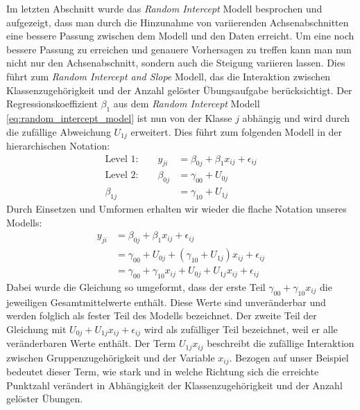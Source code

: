 \documentclass[12pt]{article}\usepackage[]{graphicx}\usepackage[]{color}
\numberwithin{equation}{section}
\begin{document}
Im letzten Abschnitt wurde das \textit{Random Intercept} Modell besprochen und aufgezeigt, dass man durch die Hinzunahme von variierenden Achsenabschnitten eine bessere Passung zwischen dem Modell und den Daten erreicht. Um eine noch bessere Passung zu erreichen und genauere Vorhersagen zu treffen kann man nun nicht nur den Achsenabschnitt, sondern auch die Steigung variieren lassen. Dies führt zum \textit{Random Intercept and Slope} Modell, das die Interaktion zwischen Klassenzugehörigkeit und der Anzahl gelöster Übungsaufgabe berücksichtigt. Der Regressionskoeffizient $\beta_{1}$ aus dem \textit{Random Intercept} Modell \eqref{eq:random_intercept_model} ist nun von der Klasse $j$ abhängig und wird durch die zufällige Abweichung $U_{1j}$ erweitert. Dies führt zum folgenden Modell in der hierarchischen Notation:
\begin{equation} \label{eq:random_intercept_slope_model}
\begin{split}	
 \text{Level 1:}  \qquad y_{ji} & = \beta_{0j} + \beta_{1}x_{ij} + \epsilon_{ij}\\
 \text{Level 2:} \qquad \beta_{0j} & = \gamma_{00} + U_{0j}\\
 \beta_{1j} & = \gamma_{10} + U_{1j}
\end{split}	
\end{equation} 
Durch Einsetzen und Umformen erhalten wir wieder die flache Notation unseres Modells:
\begin{equation} \label{eq:flat_random_intercept_slope_model}
\begin{split}	
y_{ji} & = \beta_{0j} + \beta_{1}x_{ij} + \epsilon_{ij}\\
& = \gamma_{00} + U_{0j} + (\gamma_{10} + U_{1j})x_{ij} + \epsilon_{ij}\\
& = \gamma_{00} + \gamma_{10}x_{ij} + U_{0j} + U_{1j}x_{ij} + \epsilon_{ij}
\end{split}	
\end{equation} 
Dabei wurde die Gleichung so umgeformt, dass der erste Teil $\gamma_{00} + \gamma_{10}x_{ij}$ die jeweiligen Gesamtmittelwerte enthält. Diese Werte sind unveränderbar und werden folglich als fester Teil des Modells bezeichnet. Der zweite Teil der Gleichung mit $U_{0j} + U_{1j}x_{ij} + \epsilon_{ij}$ wird als zufälliger Teil bezeichnet, weil er alle veränderbaren Werte enthält. Der Term $U_{1j}x_{ij}$ beschreibt die zufällige Interaktion zwischen Gruppenzugehörigkeit und der Variable $x_{ij}$. Bezogen auf unser Beispiel bedeutet dieser Term, wie stark und in welche Richtung sich die erreichte Punktzahl verändert in Abhängigkeit der Klassenzugehörigkeit und der Anzahl gelöster Übungen. 
\end{document}
